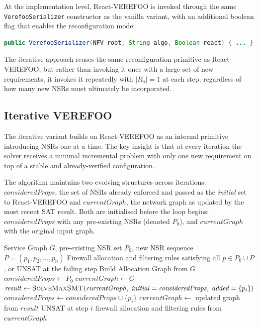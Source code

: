 At the implementation level, React-VEREFOO is invoked through the same \texttt{VerefooSerializer} constructor as the vanilla variant, with an additional boolean flag that enables the reconfiguration mode:

\begin{lstlisting}[language=Java, caption={React-VEREFOO constructor.}, label={lst:react-constructor}]
public VerefooSerializer(NFV root, String algo, Boolean react) { ... }
\end{lstlisting}

The iterative approach reuses the same reconfiguration primitive as React-VEREFOO, but rather than invoking it once with a large set of new requirements, it invokes it repeatedly with $|R_a| = 1$ at each step, regardless of how many new NSRs must ultimately be incorporated.

\subsection{Iterative VEREFOO}

The iterative variant builds on React-VEREFOO as an internal primitive introducing NSRs one at a time. The key insight is that at every iteration the solver receives a minimal incremental problem with only one new requirement on top of a stable and already-verified configuration.

The algorithm maintains two evolving structures across iterations: $\mathit{consideredProps}$, the set of NSRs already enforced and passed as the \textit{initial} set to React-VEREFOO and $\mathit{currentGraph}$, the network graph as updated by the most recent SAT result. Both are initialised before the loop begins: $\mathit{consideredProps}$ with any pre-existing NSRs (denoted $P_0$), and $\mathit{currentGraph}$ with the original input graph.

\begin{algorithm}[H]
\caption{Iterative VEREFOO}
\label{alg:iterative}
\begin{algorithmic}[1]
\Require Service Graph $G$, pre-existing NSR set $P_0$, new NSR sequence $P = (p_1, p_2, \ldots, p_n)$
\Ensure Firewall allocation and filtering rules satisfying all $p \in P_0 \cup P$, or UNSAT at the failing step
\State Build Allocation Graph from $G$
\State $\mathit{consideredProps} \gets P_0$
\State $\mathit{currentGraph} \gets G$
    \State $\mathit{result} \gets \textsc{SolveMaxSMT}(\mathit{currentGraph},\; \mathit{initial} = \mathit{consideredProps},\; \mathit{added} = \{p_i\})$
        \State $\mathit{consideredProps} \gets \mathit{consideredProps} \cup \{p_i\}$
        \State $\mathit{currentGraph} \gets$ updated graph from $\mathit{result}$
    \Else
        \State \Return UNSAT at step $i$
    \EndIf
\EndFor
\State \Return firewall allocation and filtering rules from $\mathit{currentGraph}$
\end{algorithmic}
\end{algorithm}

